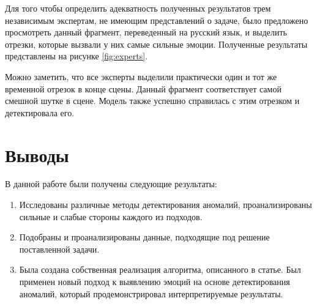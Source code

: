 \documentclass{article}
\begin{document}
Для того чтобы определить адекватность полученных результатов трем независимым экспертам, не имеющим представлений о задаче, было предложено просмотреть данный фрагмент, переведенный на русский язык, и выделить отрезки, которые вызвали у них самые сильные эмоции. Полученные результаты представлены на рисунке \ref{fig:experts}.

Можно заметить, что все эксперты выделили практически один и тот же временной отрезок в конце сцены. Данный фрагмент соответствует самой смешной шутке в сцене. Модель также успешно справилась с этим отрезком и детектировала его.


\section{Выводы}
В данной работе были получены следующие результаты:
\begin{enumerate}
    \item Исследованы различные методы детектирования аномалий, проанализированы сильные и слабые стороны каждого из подходов.

    \item  Подобраны и проанализированы данные, подходящие под решение поставленной задачи.

    \item Была создана собственная реализация алгоритма, описанного в статье. Был применен новый подход к выявлению эмоций на основе детектирования аномалий, который продемонстрировал интерпретируемые результаты.
\end{enumerate}
    


\end{document}
